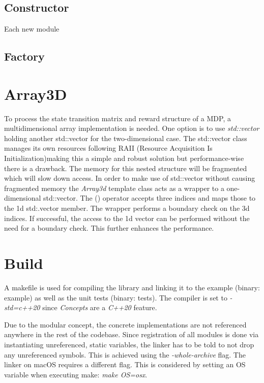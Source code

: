 \subsection{Constructor}
Each new module 


\subsection{Factory}


\section{Array3D}

To process the state transition matrix and reward structure of a MDP, a multidimensional array implementation is needed. One option is to use \emph{std::vector} holding another std::vector for the two-dimensional case. The std::vector class manages its own resources following RAII (Resource Acquisition Is Initialization)making this a simple and robust solution but performance-wise there is a drawback. The memory for this nested structure will be fragmented which will slow down access. 
In order to make use of std::vector without causing fragmented memory the \emph{Array3d} template class acts as a wrapper to a one-dimensional std::vector. The () operator accepts three indices and maps those to the 1d std:.vector member. The wrapper performs a boundary check on the 3d indices. If successful, the access to the 1d vector can be performed without the need for a boundary check. This further enhances the performance.  

\section{Build}

A makefile is used for compiling the library and linking it to the example (binary: example) as well as the unit tests (binary: tests). The compiler is set to \emph{-std=c++20} since \emph{Concepts} are a \emph{C++20} feature. 

Due to the modular concept, the concrete implementations are not referenced anywhere in the rest of the codebase. Since registration of all modules is done via instantiating unreferenced, static variables, the linker has to be told to not drop any unreferenced symbols. This is achieved using the \emph{-whole-archive} flag. The linker on macOS requires a different flag. This is considered by setting an OS variable when executing make: \emph{make OS=osx}.



